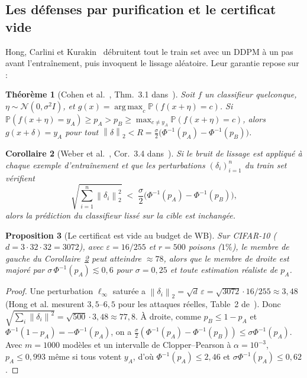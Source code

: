 \documentclass[11pt,a4paper]{article}
\theoremstyle{plain}
\newtheorem{theorem}{Théorème}[section]
\newtheorem{proposition}[theorem]{Proposition}
\newtheorem{corollary}[theorem]{Corollaire}
\theoremstyle{definition}
\theoremstyle{remark}
\newcommand{\Prob}{\mathbb{P}}
\newcommand{\norm}[1]{\left\lVert #1 \right\rVert}
\DeclareMathOperator{\argmax}{arg\,max}
\begin{document}
\subsection{Les défenses par purification et le certificat vide}

Hong, Carlini et Kurakin~\cite{hong2024} débruitent tout le train set avec un DDPM à un pas avant
l'entraînement, puis invoquent le lissage aléatoire. Leur garantie repose sur :

\begin{theorem}[{Cohen et al.~\cite{cohen2019}, Thm.~3.1 dans~\cite{hong2024}}]
Soit $f$ un classifieur quelconque, $\eta\sim\mathcal N(0,\sigma^2I)$, et $g(x)=\argmax_c\Prob(f(x+\eta)=c)$.
Si $\Prob(f(x+\eta)=y_A)\ge p_A>p_B\ge\max_{c\ne y_A}\Prob(f(x+\eta)=c)$, alors $g(x+\delta)=y_A$
pour tout $\norm\delta_2<R=\frac\sigma2\big(\Phi^{-1}(p_A)-\Phi^{-1}(p_B)\big)$.
\end{theorem}

\begin{corollary}[{Weber et al.~\cite{weber2023}, Cor.~3.4 dans~\cite{hong2024}}]\label{cor:weber}
Si le bruit de lissage est appliqué à chaque exemple d'entraînement et que les perturbations
$(\delta_i)_{i=1}^n$ du train set vérifient
\[
\sqrt{\textstyle\sum_{i=1}^n\norm{\delta_i}_2^2}\;<\;\frac\sigma2\big(\Phi^{-1}(p_A)-\Phi^{-1}(p_B)\big),
\]
alors la prédiction du classifieur lissé sur la cible est inchangée.
\end{corollary}

\begin{proposition}[Le certificat est vide au budget de WB]\label{prop:vide}
Sur CIFAR-10 ($d=3\cdot32\cdot32=3072$), avec $\varepsilon=16/255$ et $r=500$ poisons ($1\%$),
le membre de gauche du Corollaire~\ref{cor:weber} peut atteindre $\approx78$, alors que le membre
de droite est majoré par $\sigma\,\Phi^{-1}(p_A)\lesssim0{,}6$ pour $\sigma=0{,}25$ et toute
estimation réaliste de $p_A$.
\end{proposition}
\begin{proof}
Une perturbation $\ell_\infty$ saturée a $\norm{\delta_i}_2=\sqrt d\,\varepsilon=\sqrt{3072}\cdot16/255\approx3{,}48$
(Hong et al. mesurent $3{,}5$--$6{,}5$ pour les attaques réelles, Table~2 de~\cite{hong2024}).
Donc $\sqrt{\sum_i\norm{\delta_i}^2}=\sqrt{500}\cdot3{,}48\approx77{,}8$. À droite, comme
$p_B\le1-p_A$ et $\Phi^{-1}(1-p_A)=-\Phi^{-1}(p_A)$, on a
$\frac\sigma2(\Phi^{-1}(p_A)-\Phi^{-1}(p_B))\le\sigma\Phi^{-1}(p_A)$. Avec $m=1000$ modèles et
un intervalle de Clopper--Pearson à $\alpha=10^{-3}$, $p_A\le0{,}993$ même si tous votent $y_A$,
d'où $\Phi^{-1}(p_A)\le2{,}46$ et $\sigma\Phi^{-1}(p_A)\le0{,}62$.
\end{proof}
\end{document}
